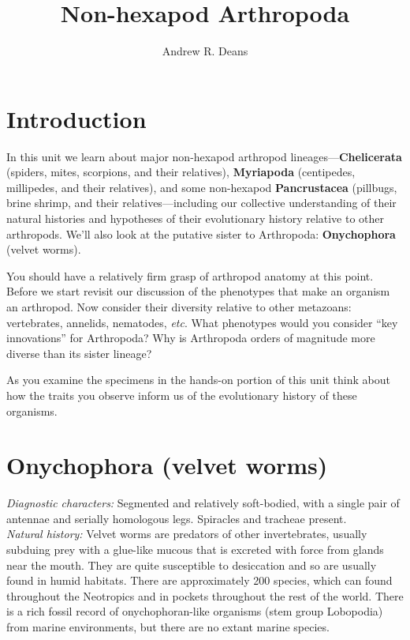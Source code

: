 \documentclass[letterpaper, 11pt]{article}
\title{Non-hexapod Arthropoda}
\author{Andrew R. Deans}
\begin{document}
\cleanlookdateon %
\maketitle
\thispagestyle{fancy}
\section*{Introduction}
In this unit we learn about major non-hexapod arthropod lineages---\textbf{Chelicerata} (spiders, mites, scorpions, and their relatives), \textbf{Myriapoda} (centipedes, millipedes, and their relatives), and some non-hexapod \textbf{Pancrustacea} (pillbugs, brine shrimp, and their relatives---including our collective understanding of their natural histories and hypotheses of their evolutionary history relative to other arthropods. We'll also look at the putative sister to Arthropoda: \textbf{Onychophora} (velvet worms).

You should have a relatively firm grasp of arthropod anatomy at this point. Before we start revisit our discussion of the phenotypes that make an organism an arthropod. Now consider their diversity relative to other metazoans: vertebrates, annelids, nematodes, \textit{etc}. What phenotypes would you consider ``key innovations'' for Arthropoda? Why is Arthropoda orders of magnitude more diverse than its sister lineage?

As you examine the specimens in the hands-on portion of this unit think about how the traits you observe inform us of the evolutionary history of these organisms.

\section{Onychophora (velvet worms)}
\noindent{}\textit{Diagnostic characters:} Segmented and relatively soft-bodied, with a single pair of antennae and serially homologous legs. Spiracles and tracheae present.\\

\noindent{}\textit{Natural history:} Velvet worms are predators of other invertebrates, usually subduing prey with a glue-like mucous that is excreted with force from glands near the mouth. They are quite susceptible to desiccation and so are usually found in humid habitats. There are approximately 200 species, which can found throughout the Neotropics and in pockets throughout the rest of the world. There is a rich fossil record of onychophoran-like organisms (stem group Lobopodia) from marine environments, but there are no extant marine species.\\
\end{document}
